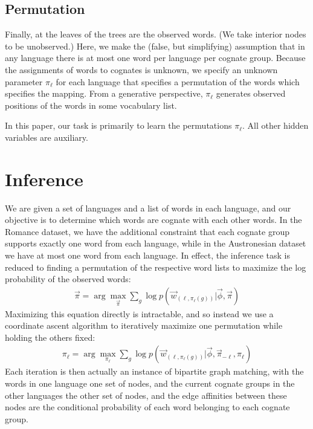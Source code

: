 \documentclass[11pt,a4paper]{article}
\begin{document}
\subsection{Permutation}

Finally, at the leaves of the trees are the observed words. (We
take interior nodes to be unobserved.) Here, we make the (false,
but simplifying) assumption that in any language there is at most
one word per language per cognate group. Because the assignments
of words to cognates is unknown, we specify an unknown parameter
$\pi_\ell$ for each language that specifies a permutation of the
words which specifies the mapping. From a generative perspective,
$\pi_\ell$ generates observed positions of the words in some
vocabulary list.

In this paper, our task is primarily to learn the permutations
$\pi_\ell$. All other hidden variables are auxiliary.

\section{Inference}

We are given a set of languages and a list of words in each language,
and our objective is to determine which words are cognate with each
other words. In the Romance dataset, we have the additional constraint
that each cognate group supports exactly one word from each language,
while in the Austronesian dataset we have at most one word from each
language. In effect, the inference task is reduced to finding a
permutation of the respective word lists to maximize the log
probability of the observed words:
\begin{equation}
  \begin{split}
    \vec{\pi} = \arg\!\max_{\vec \pi} \sum_{g} \log p(\vec w_{(\ell,\pi_\ell(g))}|\vec \phi,\vec \pi)
   \end{split}
 \end{equation}
Maximizing this equation directly is intractable, and so instead
we use a coordinate ascent algorithm to iteratively maximize one
permutation while holding the others fixed:
\begin{equation}
  \begin{split}
    \pi_\ell = \arg\!\max_{\pi_\ell} \sum_{g} \log p(\vec w_{(\ell,\pi_\ell(g))}|\vec \phi,\vec \pi_{-\ell},\pi_\ell)
  \end{split}
\end{equation}
Each iteration is then actually an instance of bipartite graph
matching, with the words in one language one set of nodes, and the
current cognate groups in the other languages the other set of
nodes, and the edge affinities between these nodes are the conditional
probability of each word belonging to each cognate group.
\end{document}
